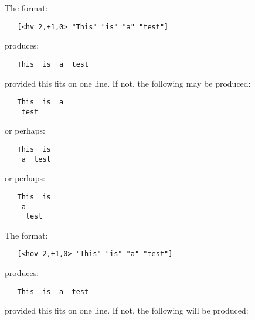 The format:

\begin{small}\begin{verbatim}
   [<hv 2,+1,0> "This" "is" "a" "test"]
\end{verbatim}\end{small}

\noindent
produces:

\begin{small}\begin{verbatim}
   This  is  a  test
\end{verbatim}\end{small}

\noindent
provided this fits on one line. If not, the following may be produced:

\begin{small}\begin{verbatim}
   This  is  a
    test
\end{verbatim}\end{small}

\noindent
or perhaps:

\begin{small}\begin{verbatim}
   This  is
    a  test
\end{verbatim}\end{small}

\noindent
or perhaps:

\begin{small}\begin{verbatim}
   This  is
    a
     test
\end{verbatim}\end{small}

\noindent
The format:

\begin{small}\begin{verbatim}
   [<hov 2,+1,0> "This" "is" "a" "test"]
\end{verbatim}\end{small}

\noindent
produces:

\begin{small}\begin{verbatim}
   This  is  a  test
\end{verbatim}\end{small}

\noindent
provided this fits on one line. If not, the following will be produced:

